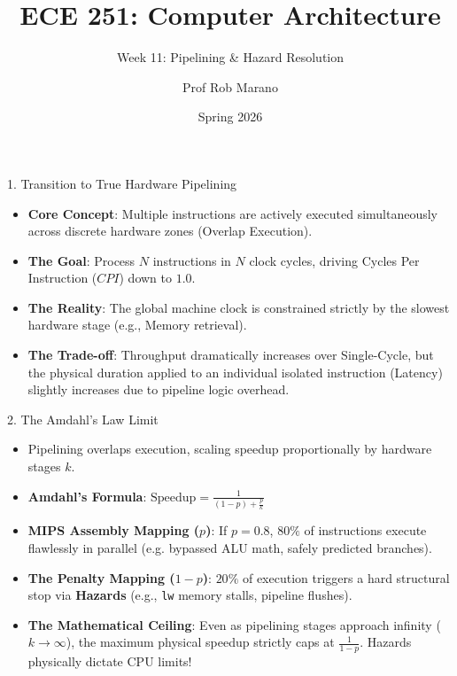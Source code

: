 \documentclass[aspectratio=169]{beamer}
\title{ECE 251: Computer Architecture}
\subtitle{Week 11: Pipelining \& Hazard Resolution}
\author{Prof Rob Marano}
\date{Spring 2026}
\begin{document}
\begin{frame}
\titlepage
\end{frame}

\begin{frame}{1. Transition to True Hardware Pipelining}
\begin{itemize}
    \item \textbf{Core Concept}: Multiple instructions are actively executed simultaneously across discrete hardware zones (Overlap Execution).
    \item \textbf{The Goal}: Process $N$ instructions in $N$ clock cycles, driving Cycles Per Instruction ($CPI$) down to $1.0$.
    \item \textbf{The Reality}: The global machine clock is constrained strictly by the slowest hardware stage (e.g., Memory retrieval).
    \item \textbf{The Trade-off}: Throughput dramatically increases over Single-Cycle, but the physical duration applied to an individual isolated instruction (Latency) slightly increases due to pipeline logic overhead.
\end{itemize}
\end{frame}

\begin{frame}{2. The Amdahl's Law Limit}
\begin{itemize}
    \item Pipelining overlaps execution, scaling speedup proportionally by hardware stages $k$.
    \item \textbf{Amdahl's Formula}: $\text{Speedup} = \frac{1}{(1 - p) + \frac{p}{k}}$
    \item \textbf{MIPS Assembly Mapping ($p$)}: If $p = 0.8$, $80\%$ of instructions execute flawlessly in parallel (e.g. bypassed ALU math, safely predicted branches).
    \item \textbf{The Penalty Mapping ($1-p$)}: $20\%$ of execution triggers a hard structural stop via \textbf{Hazards} (e.g., \texttt{lw} memory stalls, pipeline flushes).
    \item \textbf{The Mathematical Ceiling}: Even as pipelining stages approach infinity ($k \to \infty$), the maximum physical speedup strictly caps at $\frac{1}{1-p}$. Hazards physically dictate CPU limits!
\end{itemize}
\end{frame}
\end{document}
